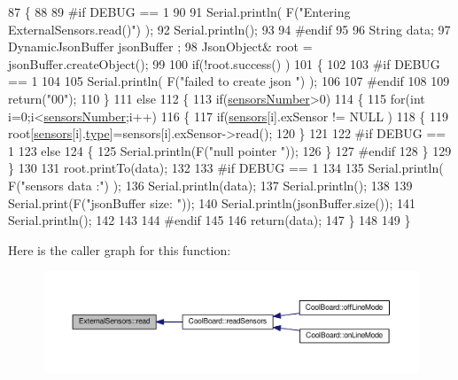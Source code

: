 \begin{DoxyCode}
87 \{
88 
89 \textcolor{preprocessor}{#if DEBUG == 1}
90 
91     Serial.println( F(\textcolor{stringliteral}{"Entering ExternalSensors.read()"}) );
92     Serial.println();
93 
94 \textcolor{preprocessor}{#endif }
95 
96     String data;
97     DynamicJsonBuffer  jsonBuffer ;
98     JsonObject& root = jsonBuffer.createObject();
99 
100     \textcolor{keywordflow}{if}(!root.success() )
101     \{
102  
103 \textcolor{preprocessor}{    #if DEBUG == 1}
104 
105         Serial.println( F(\textcolor{stringliteral}{"failed to create json "}) );
106     
107 \textcolor{preprocessor}{    #endif }
108 
109         \textcolor{keywordflow}{return}(\textcolor{stringliteral}{"00"});
110     \}
111     \textcolor{keywordflow}{else}
112     \{
113         \textcolor{keywordflow}{if}(\hyperlink{classExternalSensors_a58e4fbf9adeae787d92be5fa33043b5d}{sensorsNumber}>0)
114         \{
115             \textcolor{keywordflow}{for}(\textcolor{keywordtype}{int} i=0;i<\hyperlink{classExternalSensors_a58e4fbf9adeae787d92be5fa33043b5d}{sensorsNumber};i++)
116             \{
117                 \textcolor{keywordflow}{if}(\hyperlink{classExternalSensors_a284233f884fcf00154a44740cf1d9e1e}{sensors}[i].exSensor != NULL )
118                 \{
119                     root[\hyperlink{classExternalSensors_a284233f884fcf00154a44740cf1d9e1e}{sensors}[i].\hyperlink{structExternalSensors_1_1sensor_a6acfdb02c742c2110d7bd2b5d9fce9e7}{type}]=sensors[i].exSensor->read();       
120                 \}
121             
122 \textcolor{preprocessor}{            #if DEBUG == 1}
123                 \textcolor{keywordflow}{else}
124                 \{
125                     Serial.println(F(\textcolor{stringliteral}{"null pointer "}));
126                 \}
127 \textcolor{preprocessor}{            #endif  }
128             \}
129         \}   
130         
131         root.printTo(data);
132     
133 \textcolor{preprocessor}{    #if DEBUG == 1}
134 
135         Serial.println( F(\textcolor{stringliteral}{"sensors data :"}) );
136         Serial.println(data);
137         Serial.println();
138 
139         Serial.print(F(\textcolor{stringliteral}{"jsonBuffer size: "}));
140         Serial.println(jsonBuffer.size());
141         Serial.println();
142 
143     
144 \textcolor{preprocessor}{    #endif}
145     
146         \textcolor{keywordflow}{return}(data);
147     \}
148 
149 \}
\end{DoxyCode}
Here is the caller graph for this function\+:\nopagebreak
\begin{figure}[H]
\begin{center}
\leavevmode
\includegraphics[width=350pt]{classExternalSensors_a53177b81eca3be89508b5511ddcd00fc_icgraph}
\end{center}
\end{figure}


